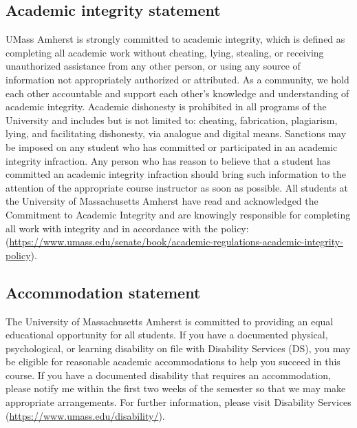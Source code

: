 \documentclass[11pt]{article}
\begin{document}
\subsection*{Academic integrity statement}
\label{sec:orgd144d09}
UMass Amherst is strongly committed to academic integrity, which is defined as
completing all academic work without cheating, lying, stealing, or receiving
unauthorized assistance from any other person, or using any source of
information not appropriately authorized or attributed. As a community, we hold
each other accountable and support each other’s knowledge and understanding of
academic integrity. Academic dishonesty is prohibited in all programs of the
University and includes but is not limited to: cheating, fabrication,
plagiarism, lying, and facilitating dishonesty, via analogue and digital means.
Sanctions may be imposed on any student who has committed or participated in an
academic integrity infraction. Any person who has reason to believe that a
student has committed an academic integrity infraction should bring such
information to the attention of the appropriate course instructor as soon as
possible. All students at the University of Massachusetts Amherst have read and
acknowledged the Commitment to Academic Integrity and are knowingly responsible
for completing all work with integrity and in accordance with the policy:
(\url{https://www.umass.edu/senate/book/academic-regulations-academic-integrity-policy}).

\subsection*{Accommodation statement}
\label{sec:org90ab4eb}
The University of Massachusetts Amherst is committed to providing an equal
educational opportunity for all students. If you have a documented physical,
psychological, or learning disability on file with Disability Services (DS),
you may be eligible for reasonable academic accommodations to help you succeed
in this course. If you have a documented disability that requires an
accommodation, please notify me within the first two weeks of the semester so
that we may make appropriate arrangements. For further information, please
visit Disability Services (\url{https://www.umass.edu/disability/}).
\end{document}
